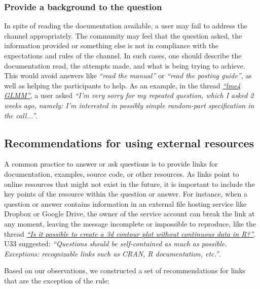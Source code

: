 \subsubsection{Provide a background to the question}

    In spite of reading the documentation available, a user may fail to address the channel appropriately.
    The community may feel that the question asked, the information provided or something else is not in compliance with the expectations and rules of the channel.
    In such cases, one should describe the documentation read, the attempts made, and what is being trying to achieve.
    This would avoid answers like \textit{``read the manual''} or \textit{``read the posting guide''}, as well as helping the participants to help.
    As an example, in the thread \textit{\href{https://goo.gl/Gbek3R}{``lme4 GLMM''}}, a user asked \textit{``I'm very sorry for my repeated question, which I asked 2 weeks ago, namely: I'm interested in possibly simple random-part specification in the call...''}.

\subsection{Recommendations for using external resources}

    A common practice to answer or ask questions is to provide links for documentation, examples, source code, or other resources.
    As links point to online resources that might not exist in the future, it is important to include the key points of the resource within the question or answer.
    For instance, when a question or answer contains information in an external file hosting service like Dropbox or Google Drive, the owner of the service account can break the link at any moment, leaving the message incomplete or impossible to reproduce, like the thread \textit{\href{http://goo.gl/5nanFU}{``Is it possible to create a 3d contour plot without continuous data in R?''}}.
    U33 suggested: \textit{``Questions should be self-contained as much as possible. Exceptions: recognizable links such as CRAN, R documentation, etc.''}.

    Based on our observations, we constructed a set of recommendations for links that are the exception of the rule:

